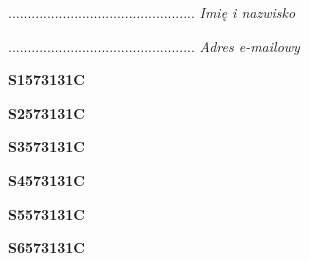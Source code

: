 \begin{turn}{90}\begin{minipage}{\linewidth} \vspace{20mm} ................................................  \textit{Imię i nazwisko}\end{minipage}\end{turn}

\begin{turn}{90}\begin{minipage}{\linewidth} \vspace{20mm} ................................................  \textit{Adres e-mailowy}\end{minipage}\end{turn}

\begin{turn}{90}\huge \begin{minipage}{\linewidth} \vspace{10mm}\textbf{S1573131C}\end{minipage}\end{turn}

\begin{turn}{90}\huge \begin{minipage}{\linewidth} \vspace{10mm}\textbf{S2573131C}\end{minipage}\end{turn}

\begin{turn}{90}\huge \begin{minipage}{\linewidth} \vspace{10mm}\textbf{S3573131C}\end{minipage}\end{turn}

\begin{turn}{90}\huge \begin{minipage}{\linewidth} \vspace{10mm}\textbf{S4573131C}\end{minipage}\end{turn}

\begin{turn}{90}\huge \begin{minipage}{\linewidth} \vspace{10mm}\textbf{S5573131C}\end{minipage}\end{turn}

\begin{turn}{90}\huge \begin{minipage}{\linewidth} \vspace{10mm}\textbf{S6573131C}\end{minipage}\end{turn}

